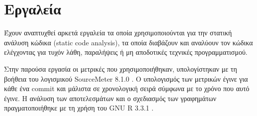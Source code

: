 \section{Εργαλεία}

Έχουν αναπτυχθεί αρκετά εργαλεία τα οποία χρησιμοποιούνται για την στατική ανάλυση κώδικα (static code analysis), τα οποία διαβάζουν και αναλύουν τον κώδικα ελέγχοντας για τυχόν λάθη, παραλήψεις ή μη αποδοτικές τεχνικές προγραμματισμού.

Στην παρούσα εργασία οι μετρικές που χρησιμοποιήθηκαν, υπολογίστηκαν με τη βοήθεια του λογισμικού SourceMeter 8.1.0 \cite{SOURCEMETER}. Ο υπολογισμός των μετρικών έγινε για κάθε ένα commit και μάλιστα σε χρονολογική σειρά σύμφωνα με το χρόνο που αυτό έγινε. Η ανάλυση των αποτελεσμάτων και ο σχεδιασμός των γραφημάτων πραγματοποιήθηκε με τη χρήση του GNU R 3.3.1 \cite{R}.